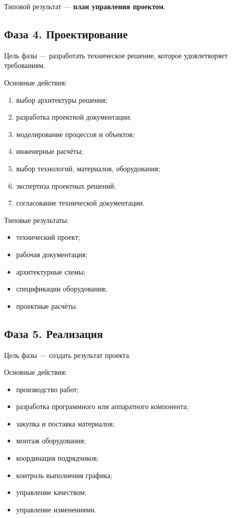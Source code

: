 \documentclass[12pt,a4paper]{article}
\begin{document}
Типовой результат --- \textbf{план управления проектом}.

\subsection{Фаза 4. Проектирование}

Цель фазы --- разработать техническое решение, которое удовлетворяет требованиям.

Основные действия:
\begin{enumerate}
    \item выбор архитектуры решения;
    \item разработка проектной документации;
    \item моделирование процессов и объектов;
    \item инженерные расчёты;
    \item выбор технологий, материалов, оборудования;
    \item экспертиза проектных решений;
    \item согласование технической документации.
\end{enumerate}

Типовые результаты:
\begin{itemize}
    \item технический проект;
    \item рабочая документация;
    \item архитектурные схемы;
    \item спецификации оборудования;
    \item проектные расчёты.
\end{itemize}

\subsection{Фаза 5. Реализация}

Цель фазы --- создать результат проекта.

Основные действия:
\begin{itemize}
    \item производство работ;
    \item разработка программного или аппаратного компонента;
    \item закупка и поставка материалов;
    \item монтаж оборудования;
    \item координация подрядчиков;
    \item контроль выполнения графика;
    \item управление качеством;
    \item управление изменениями.
\end{itemize}
\end{document}

